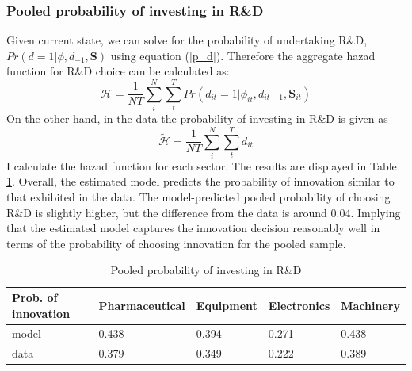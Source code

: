 \documentclass[11pt]{article}
\begin{document}
\subsubsection{Pooled probability of investing in R\&D}
Given current state, we can solve for the probability of undertaking R\&D,$Pr(d=1|\phi,d_{-1},\mathbf{S})$ using equation (\ref{p_d}). Therefore the aggregate hazad function for R\&D choice can be calculated as:
\begin{equation}\label{hazad}
\mathcal{H}=\frac{1}{NT}\sum_{i}^{N}\sum_{t}^{T} Pr(d_{it}=1|\phi_{it},d_{it-1},\mathbf{S}_{it})
\end{equation}
On the other hand, in the data the probability of investing in R\&D is given as
\begin{equation}
\tilde {\mathcal{H}}=\frac{1}{NT}\sum_{i}^{N}\sum_{t}^{T} d_{it}
\end{equation}
I calculate the hazad function for each sector. The results are displayed in Table \ref{T15}. Overall, the estimated model predicts the probability of innovation similar to that exhibited in the data. The model-predicted pooled probability of choosing R\&D is slightly higher, but the difference from the data is around 0.04. Implying that the estimated model captures the innovation decision reasonably well in terms of the probability of choosing innovation for the pooled sample. 

\begin{table}[h]
\centering
\caption{Pooled probability of investing in R\&D}
\label{T15}
\begin{tabular}{lllll}
\toprule
Prob. of innovation & Pharmaceutical & Equipment & Electronics & Machinery \\
\hline
model & 0.438 & 0.394 & 0.271 & 0.438 \\
data  & 0.379 & 0.349 & 0.222 & 0.389 \\  \bottomrule
\end{tabular}
\end{table}
\end{document}
